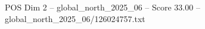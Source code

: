 \begin{textsample}{POS Dim 2 – global\_north\_2025\_06 – Score 33.00 – global\_north\_2025\_06/126024757.txt}
\end{textsample}
